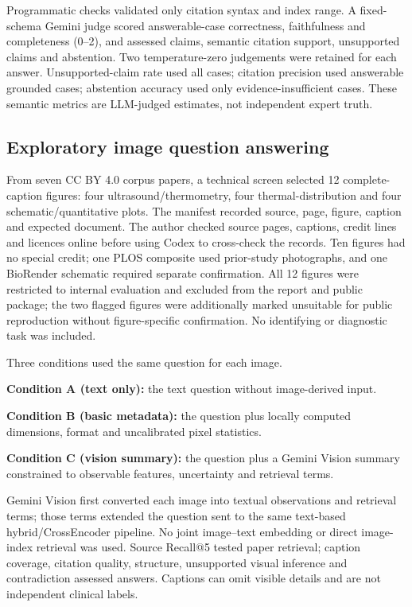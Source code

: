 \documentclass[11pt,a4paper]{article}
\begin{document}
Programmatic checks validated only citation syntax and index range. A fixed-schema Gemini judge scored answerable-case correctness, faithfulness and completeness (0--2), and assessed claims, semantic citation support, unsupported claims and abstention. Two temperature-zero judgements were retained for each answer. Unsupported-claim rate used all cases; citation precision used answerable grounded cases; abstention accuracy used only evidence-insufficient cases. These semantic metrics are LLM-judged estimates, not independent expert truth.

\subsection{Exploratory image question answering}
\label{sec:exploratory-image-question-answering}

From seven CC BY 4.0 corpus papers, a technical screen selected 12 complete-caption figures: four ultrasound/thermometry, four thermal-distribution and four schematic/quantitative plots. The manifest recorded source, page, figure, caption and expected document. The author checked source pages, captions, credit lines and licences online before using Codex to cross-check the records. Ten figures had no special credit; one PLOS composite used prior-study photographs, and one BioRender schematic required separate confirmation. All 12 figures were restricted to internal evaluation and excluded from the report and public package; the two flagged figures were additionally marked unsuitable for public reproduction without figure-specific confirmation. No identifying or diagnostic task was included.

Three conditions used the same question for each image.

\textbf{Condition A (text only):} the text question without image-derived input.

\textbf{Condition B (basic metadata):} the question plus locally computed dimensions, format and uncalibrated pixel statistics.

\textbf{Condition C (vision summary):} the question plus a Gemini Vision summary constrained to observable features, uncertainty and retrieval terms.

Gemini Vision first converted each image into textual observations and retrieval terms; those terms extended the question sent to the same text-based hybrid/CrossEncoder pipeline. No joint image--text embedding or direct image-index retrieval was used. Source Recall@5 tested paper retrieval; caption coverage, citation quality, structure, unsupported visual inference and contradiction assessed answers. Captions can omit visible details and are not independent clinical labels.
\end{document}
